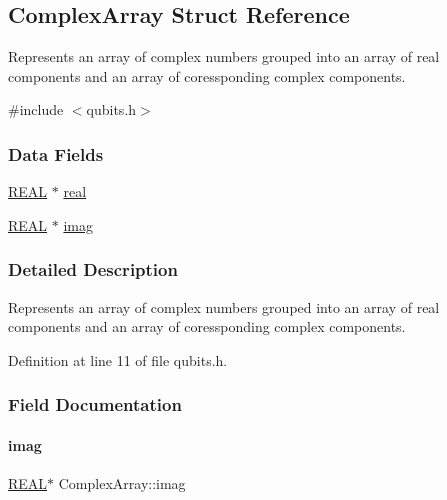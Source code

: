 \hypertarget{structComplexArray}{}\subsection{Complex\+Array Struct Reference}
\label{structComplexArray}


Represents an array of complex numbers grouped into an array of real components and an array of coressponding complex components.  




{\ttfamily \#include $<$qubits.\+h$>$}

\subsubsection*{Data Fields}
\begin{DoxyCompactItemize}
\item 
\hyperlink{precision_8h_a4b654506f18b8bfd61ad2a29a7e38c25}{R\+E\+AL} $\ast$ \hyperlink{structComplexArray_a4195cac6c784ea1b6271f1c7dba1548a}{real}
\item 
\hyperlink{precision_8h_a4b654506f18b8bfd61ad2a29a7e38c25}{R\+E\+AL} $\ast$ \hyperlink{structComplexArray_a79dde47c7ae530c79cebfdf57b225968}{imag}
\end{DoxyCompactItemize}


\subsubsection{Detailed Description}
Represents an array of complex numbers grouped into an array of real components and an array of coressponding complex components. 

Definition at line 11 of file qubits.\+h.



\subsubsection{Field Documentation}
\mbox{\label{structComplexArray_a79dde47c7ae530c79cebfdf57b225968}} 
\paragraph{\texorpdfstring{imag}{imag}}
{\footnotesize\ttfamily \hyperlink{precision_8h_a4b654506f18b8bfd61ad2a29a7e38c25}{R\+E\+AL}$\ast$ Complex\+Array\+::imag}



